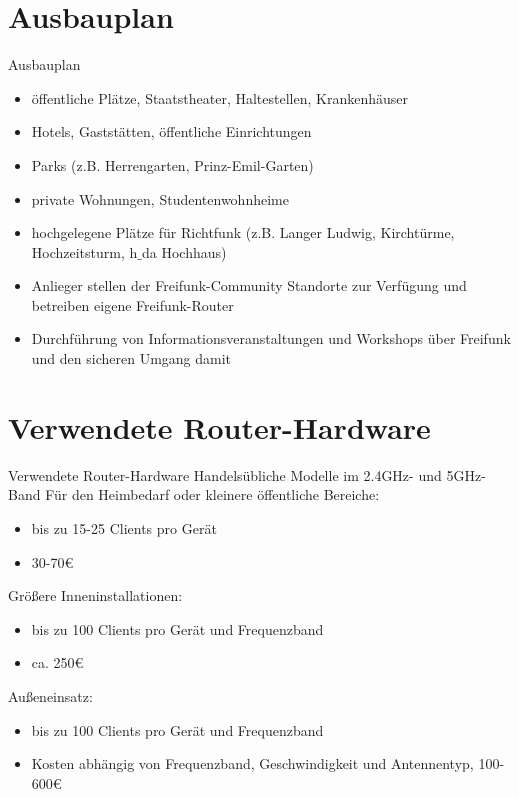 \documentclass{beamer}
\begin{document}
\section{Ausbauplan}
\begin{frame}{Ausbauplan}
\vfill
\begin{itemize}
	\item öffentliche Plätze, Staatstheater, Haltestellen, Krankenhäuser
	\item Hotels, Gaststätten, öffentliche Einrichtungen
	\item Parks (z.B. Herrengarten, Prinz-Emil-Garten)
	\item private Wohnungen, Studentenwohnheime
	\item hochgelegene Plätze für Richtfunk (z.B. Langer Ludwig, Kirchtürme, Hochzeitsturm, h$\_$da Hochhaus)
\end{itemize}
\vfill
\pause
\begin{itemize}
	\item Anlieger stellen der Freifunk-Community Standorte zur Verfügung und betreiben eigene Freifunk-Router
	\item Durchführung von Informationsveranstaltungen und Workshops über Freifunk und den sicheren Umgang damit
\end{itemize}
\vfill
\end{frame}

\section{Verwendete Router-Hardware}
\begin{frame}{Verwendete Router-Hardware}
Handelsübliche Modelle im 2.4GHz- und 5GHz-Band
\vfill
Für den Heimbedarf oder kleinere öffentliche Bereiche:
\begin{itemize}
\item bis zu 15-25 Clients pro Gerät
\item 30-70\euro{}
\end{itemize}
\vfill

Größere Inneninstallationen:
\begin{itemize}
\item bis zu 100 Clients pro Gerät und Frequenzband
\item ca. 250\euro{}
\end{itemize}
\vfill

Außeneinsatz:
\begin{itemize}
\item bis zu 100 Clients pro Gerät und Frequenzband
\item Kosten abhängig von Frequenzband, Geschwindigkeit und Antennentyp, 100-600\euro{}
\end{itemize}
\vfill
\end{frame}
\end{document}
